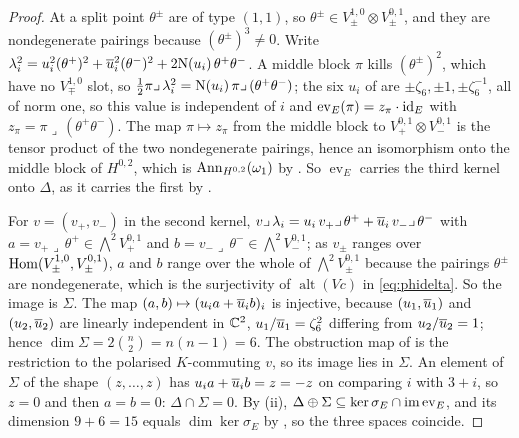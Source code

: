 \begin{proof}
At a split point $\theta^{\pm}$ are of type $(1,1)$, so $\theta^{\pm}\in
V_{\pm}^{1,0}\otimes V_{\pm}^{0,1}$, and they are nondegenerate pairings
because $(\theta^{\pm})^{3}\ne0$. Write $\lambda_{i}^{2}=u_{i}^{2}(\theta^{+})^{2}
+\overline{u}_{i}^{2}(\theta^{-})^{2}+2\mathrm{N}(u_{i})\,\theta^{+}\theta^{-}$. A middle
block $\pi$ kills $(\theta^{\pm})^{2}$, which have no $V_{\mp}^{1,0}$ slot, so
$\tfrac12\pi\lrcorner\,\lambda_{i}^{2}=\mathrm{N}(u_{i})\,\pi\lrcorner\,(\theta^{+}\theta^{-})$;
the six $u_{i}$ of  are $\pm\zeta_{6},\pm1,
\pm\zeta_{6}^{-1}$, all of norm one, so this value is independent of $i$ and
$\operatorname{ev}_{E}(\pi)=z_{\pi}\cdot\operatorname{id}_{E}$ with
$z_{\pi}=\pi\lrcorner\,(\theta^{+}\theta^{-})$. The map $\pi\mapsto z_{\pi}$
from the middle block to $V_{+}^{0,1}\otimes V_{-}^{0,1}$ is the tensor
product of the two nondegenerate pairings, hence an isomorphism onto the
middle block of $H^{0,2}$, which is $\operatorname{Ann}_{H^{0,2}}(\omega_{1})$ by
. So $\operatorname{ev}_{E}$ carries the third kernel
onto $\Delta$, as it carries the first by .

For $v=(v_{+},v_{-})$ in the second kernel,
$v\lrcorner\,\lambda_{i}=u_{i}\,v_{+}\lrcorner\,\theta^{+}+\overline{u}_{i}\,
v_{-}\lrcorner\,\theta^{-}$ with $a=v_{+}\lrcorner\,\theta^{+}\in
\bigwedge^{2}V_{+}^{0,1}$ and $b=v_{-}\lrcorner\,\theta^{-}\in\bigwedge^{2}V_{-}^{0,1}$;
as $v_{\pm}$ ranges over $\operatorname{Hom}(V_{\pm}^{1,0},V_{\pm}^{0,1})$, $a$ and $b$
range over the whole of $\bigwedge^{2}V_{\pm}^{0,1}$ because the pairings
$\theta^{\pm}$ are nondegenerate, which is the surjectivity of
$\operatorname{alt}(Vc)$ in \eqref{eq:phidelta}. So the image is $\Sigma$.
The map $(a,b)\mapsto(u_{i}a+\overline{u}_{i}b)_{i}$ is injective, because
$(u_{1},\overline{u}_{1})$ and $(u_{2},\overline{u}_{2})$ are linearly independent in
$\mathbb{C}^{2}$, $u_{1}/\overline{u}_{1}=\zeta_{6}^{2}$ differing from
$u_{2}/\overline{u}_{2}=1$; hence $\dim\Sigma=2\binom{n}{2}=n(n-1)=6$. The
obstruction map of  is the restriction to the
polarised $K$-commuting $v$, so its image lies in $\Sigma$. An element of
$\Sigma$ of the shape $(z,\dots,z)$ has $u_{i}a+\overline{u}_{i}b=z=-z$ on
comparing $i$ with $3+i$, so $z=0$ and then $a=b=0$: $\Delta\cap\Sigma=0$.
By (ii), $\Delta\oplus\Sigma\subseteq\ker\sigma_{E}\cap\operatorname{im}\operatorname{ev}_{E}$,
and its dimension $9+6=15$ equals $\dim\ker\sigma_{E}$ by
, so the three spaces coincide.


\end{proof}
